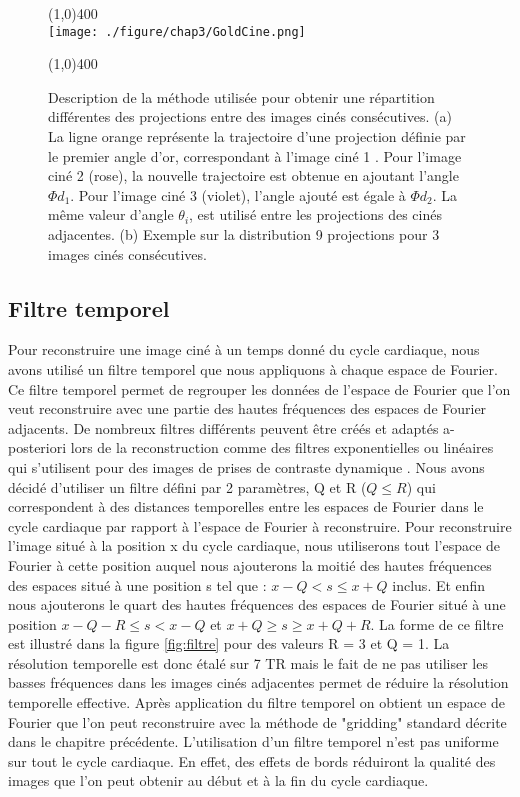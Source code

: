 \begin{figure}[H]
\centering \line(1,0){400} \\
\texttt{[image: ./figure/chap3/GoldCine.png]}
\caption[Répartition grâce à l'angle d'or entre les images ciné]{\label{fig:GoldCine} Description de la méthode utilisée pour obtenir une répartition différentes des projections entre des images cinés consécutives. (a) La ligne orange représente la trajectoire d'une projection définie par le premier angle d'or, correspondant à l'image ciné 1 . Pour l'image ciné 2 (rose), la nouvelle trajectoire est obtenue en ajoutant l'angle $\Phi d_1$. Pour l'image ciné 3 (violet), l'angle ajouté est égale à $\Phi d_2$. La même valeur d'angle $\theta_i$, est utilisé entre les projections des cinés adjacentes. (b) Exemple sur la distribution 9 projections pour 3 images cinés consécutives.}
\line(1,0){400} \\ \end{figure}

\subsection{Filtre temporel}

Pour reconstruire une image ciné à un temps donné du cycle cardiaque, nous avons utilisé un filtre temporel que nous appliquons à chaque espace de Fourier. Ce filtre temporel permet de regrouper les données de l'espace de Fourier que l'on veut reconstruire avec une partie des hautes fréquences des espaces de Fourier adjacents. De nombreux filtres différents peuvent être créés et adaptés a-posteriori lors de la reconstruction comme des filtres exponentielles ou linéaires qui s'utilisent pour des images de prises de contraste dynamique \cite{Lin:2008uq}.
Nous avons décidé d'utiliser un filtre défini par 2 paramètres, Q et R ($Q \leq R$) qui correspondent à des distances temporelles entre les espaces de Fourier dans le cycle cardiaque par rapport à l'espace de Fourier à reconstruire. Pour reconstruire l'image situé à la position x du cycle cardiaque, nous utiliserons tout l'espace de Fourier à cette position auquel nous ajouterons la moitié des hautes fréquences des espaces situé à une position s tel que : $x-Q < s \leq x+Q$ inclus. Et enfin nous ajouterons le quart des hautes fréquences des espaces de Fourier situé à une position $x-Q-R \leq s < x-Q$ et $x+Q \geq s \geq x+Q+R$. La forme de ce filtre est illustré dans la figure \ref{fig:filtre} pour des valeurs R = 3 et Q = 1.
La résolution temporelle est donc étalé sur 7 TR mais le fait de ne pas utiliser les basses fréquences dans les images cinés adjacentes permet de réduire la résolution temporelle effective.
Après application du filtre temporel on obtient un espace de Fourier que l'on peut reconstruire avec la méthode de "gridding" standard décrite dans le chapitre précédente.
L'utilisation d'un filtre temporel n'est pas uniforme sur tout le cycle cardiaque. En effet, des effets de bords réduiront la qualité des images que l'on peut obtenir au début et à la fin du cycle cardiaque.

